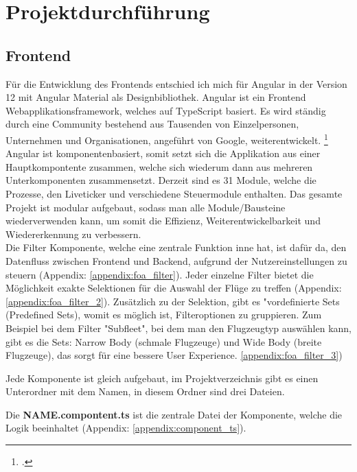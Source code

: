 \section{Projektdurchführung}

	\subsection{Frontend}
	Für die Entwicklung des Frontends entschied ich mich für Angular in der Version 12 mit Angular Material als Designbibliothek. Angular ist ein Frontend Webapplikationsframework, welches auf TypeScript basiert. Es wird ständig durch eine Community bestehend aus Tausenden von Einzelpersonen, Unternehmen und Organisationen, angeführt von Google, weiterentwickelt. \footcite{3}\\
	Angular ist komponentenbasiert, somit setzt sich die Applikation aus einer Hauptkompontente zusammen, welche sich wiederum dann aus mehreren Unterkomponenten zusammensetzt. Derzeit sind es 31 Module, welche die Prozesse, den Liveticker und verschiedene Steuermodule enthalten. Das gesamte Projekt ist modular aufgebaut, sodass man alle Module/Bausteine wiederverwenden kann, um somit die Effizienz, Weiterentwickelbarkeit und Wiedererkennung zu verbessern.\\
	Die Filter Komponente, welche eine zentrale Funktion inne hat, ist dafür da, den Datenfluss zwischen Frontend und Backend, aufgrund der Nutzereinstellungen zu steuern (Appendix: \ref{appendix:foa_filter}). Jeder einzelne Filter bietet die Möglichkeit exakte Selektionen für die Auswahl der Flüge zu treffen (Appendix: \ref{appendix:foa_filter_2}). Zusätzlich zu der Selektion, gibt es "vordefinierte Sets (Predefined Sets), womit es möglich ist, Filteroptionen zu gruppieren. Zum Beispiel bei dem Filter "Subfleet", bei dem man den Flugzeugtyp auswählen kann, gibt es die Sets: Narrow Body (schmale Flugzeuge) und Wide Body (breite Flugzeuge), das sorgt für eine bessere User Experience. \ref{appendix:foa_filter_3})\\

	\vspace{8pt}
	
	{
		\noindent
		Jede Komponente ist gleich aufgebaut, im Projektverzeichnis gibt es einen Unterordner mit dem Namen, in diesem Ordner sind drei Dateien.
	}
	\vspace{10pt}

	{
		\noindent
		Die \textbf{NAME.compontent.ts} ist die zentrale Datei der Komponente, welche die Logik beeinhaltet (Appendix: \ref{appendix:component_ts}).
	}
	\vspace{10pt}

